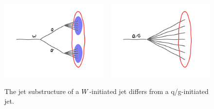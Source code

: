 \begin{figure}
  \centering
  \includegraphics[width=0.48\textwidth]{figures/razor_wtag/W_subjets}
  ~
  \includegraphics[width=0.48\textwidth]{figures/razor_wtag/qg_jets}
  \caption{The jet substructure of a $W$-initiated jet differs from a q/g-initiated jet.
  \label{fig:boost_wtag_cartoon}}
\end{figure}
